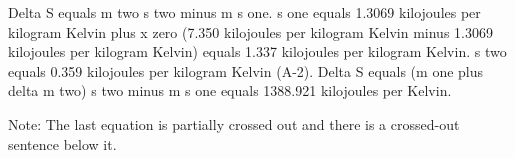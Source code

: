 Delta S equals m two s two minus m s one.  
s one equals 1.3069 kilojoules per kilogram Kelvin plus x zero (7.350 kilojoules per kilogram Kelvin minus 1.3069 kilojoules per kilogram Kelvin) equals 1.337 kilojoules per kilogram Kelvin.  
s two equals 0.359 kilojoules per kilogram Kelvin (A-2).  
Delta S equals (m one plus delta m two) s two minus m s one equals 1388.921 kilojoules per Kelvin.  

Note: The last equation is partially crossed out and there is a crossed-out sentence below it.